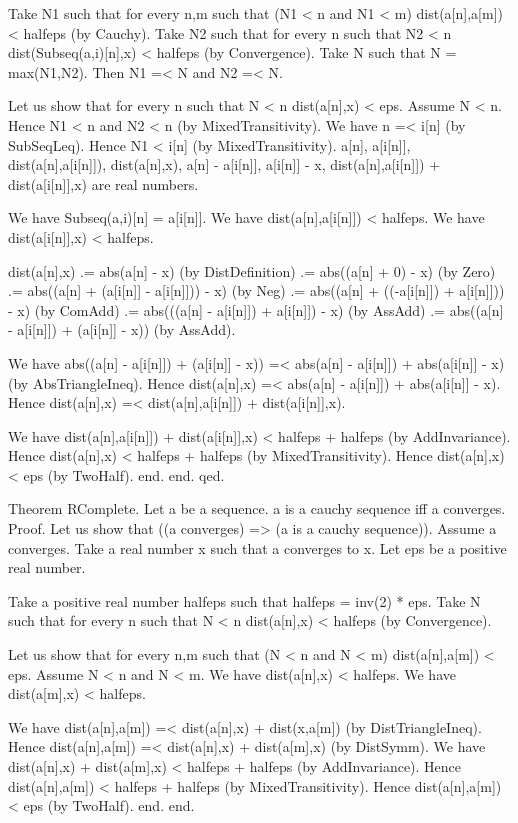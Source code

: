 \documentclass{article}
\newenvironment{forthel}{\begin{leftbar}}{\end{leftbar}}
\begin{document}
\begin{forthel}
	Take N1 such that for every n,m such that (N1 < n and N1 < m) dist(a[n],a[m]) < halfeps (by Cauchy).
	Take N2 such that for every n such that N2 < n dist(Subseq(a,i)[n],x) < halfeps (by Convergence).
	Take N such that N = max(N1,N2).
	Then N1 =< N and N2 =< N.
	
	Let us show that for every n such that N < n dist(a[n],x) < eps.
	Assume N < n. Hence N1 < n and N2 < n (by MixedTransitivity).
	We have n =< i[n] (by SubSeqLeq). Hence N1 < i[n] (by MixedTransitivity).
	a[n], a[i[n]], dist(a[n],a[i[n]]), dist(a[n],x), a[n] - a[i[n]], a[i[n]] - x, dist(a[n],a[i[n]]) + dist(a[i[n]],x) are real numbers.
	
	We have Subseq(a,i)[n] = a[i[n]].
	We have dist(a[n],a[i[n]]) < halfeps.
	We have dist(a[i[n]],x) < halfeps.
	
	dist(a[n],x) .= abs(a[n] - x) (by DistDefinition)
	.= abs((a[n] + 0) - x) (by Zero)
	.= abs((a[n] + (a[i[n]] - a[i[n]])) - x) (by Neg)
	.= abs((a[n] + ((-a[i[n]]) + a[i[n]])) - x) (by ComAdd)
	.= abs(((a[n] - a[i[n]]) + a[i[n]]) - x) (by AssAdd)
	.= abs((a[n] - a[i[n]]) + (a[i[n]] - x)) (by AssAdd).
	
	We have abs((a[n] - a[i[n]]) + (a[i[n]] - x)) =< abs(a[n] - a[i[n]]) + abs(a[i[n]] - x) (by AbsTriangleIneq).
	Hence dist(a[n],x) =< abs(a[n] - a[i[n]]) + abs(a[i[n]] - x).
	Hence dist(a[n],x) =< dist(a[n],a[i[n]]) + dist(a[i[n]],x).
	
	We have dist(a[n],a[i[n]]) + dist(a[i[n]],x) < halfeps + halfeps (by AddInvariance).
	Hence dist(a[n],x) < halfeps + halfeps (by MixedTransitivity).
	Hence dist(a[n],x) < eps (by TwoHalf).
	end.
	end.
	qed.
	
	Theorem RComplete.
	Let a be a sequence. a is a cauchy sequence iff a converges.
	Proof.
	Let us show that ((a converges) => (a is a cauchy sequence)).
	Assume a converges.
	Take a real number x such that a converges to x.
	Let eps be a positive real number.
	
	Take a positive real number halfeps such that halfeps = inv(2) * eps.
	Take N such that for every n such that N < n dist(a[n],x) < halfeps (by Convergence).
	
	Let us show that for every n,m such that (N < n and N < m) dist(a[n],a[m]) < eps.
	Assume N < n and N < m.
	We have dist(a[n],x) < halfeps.
	We have dist(a[m],x) < halfeps.
	
	We have dist(a[n],a[m]) =< dist(a[n],x) + dist(x,a[m]) (by DistTriangleIneq).
	Hence dist(a[n],a[m]) =< dist(a[n],x) + dist(a[m],x) (by DistSymm).
	We have dist(a[n],x) + dist(a[m],x) < halfeps + halfeps (by AddInvariance).
	Hence dist(a[n],a[m]) < halfeps + halfeps (by MixedTransitivity).
	Hence dist(a[n],a[m]) < eps (by TwoHalf).
	end.
	end.
	

\end{forthel}
\end{document}
